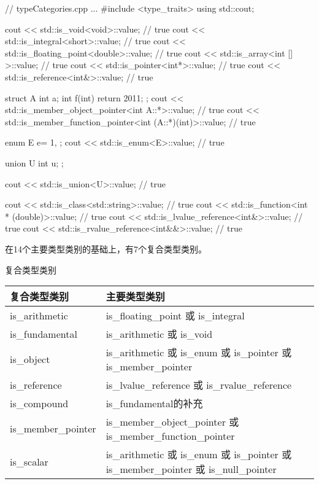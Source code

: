 \begin{cpp}
// typeCategories.cpp
...
#include <type_traits>
using std::cout;

cout << std::is_void<void>::value; // true
cout << std::is_integral<short>::value; // true
cout << std::is_floating_point<double>::value; // true
cout << std::is_array<int [] >::value; // true
cout << std::is_pointer<int*>::value; // true
cout << std::is_reference<int&>::value; // true

struct A{
	int a;
	int f(int){ return 2011; }
};
cout << std::is_member_object_pointer<int A::*>::value; // true
cout << std::is_member_function_pointer<int (A::*)(int)>::value; // true

enum E{
	e= 1,
};
cout << std::is_enum<E>::value; // true

union U{
	int u;
};

cout << std::is_union<U>::value; // true

cout << std::is_class<std::string>::value; // true
cout << std::is_function<int * (double)>::value; // true
cout << std::is_lvalue_reference<int&>::value; // true
cout << std::is_rvalue_reference<int&&>::value; // true
\end{cpp}


在14个主要类型类别的基础上，有7个复合类型类别。

\begin{center}
复合类型类别
\end{center}

\begin{longtable}[c]{|l|l|}
\hline
\textbf{复合类型类别} & \textbf{主要类型类别}                 \\ \hline
\endfirsthead
%
\endhead
%
is\_arithmetic                     & is\_floating\_point 或 is\_integral            \\ \hline
is\_fundamental                    & is\_arithmetic 或 is\_void                     \\ \hline
is\_object          & is\_arithmetic 或 is\_enum 或 is\_pointer 或 is\_member\_pointer                      \\ \hline
is\_reference                      & is\_lvalue\_reference 或 is\_rvalue\_reference \\ \hline
is\_compound                       &  is\_fundamental的补充                  \\ \hline
is\_member\_pointer & is\_member\_object\_pointer 或 is\_member\_function\_pointer                          \\ \hline
is\_scalar          & is\_arithmetic 或 is\_enum 或 is\_pointer 或 is\_member\_pointer 或 is\_null\_pointer \\ \hline
\end{longtable}


